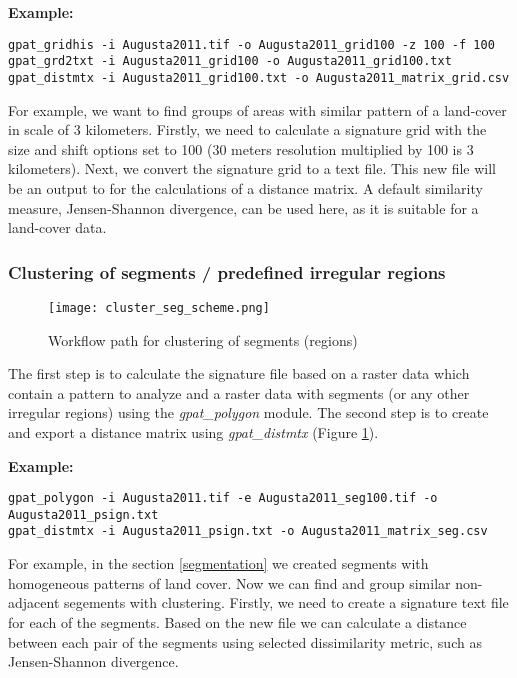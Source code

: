 {\bf Example:}

\begin{minipage}{\linewidth}
\begin{lstlisting}
gpat_gridhis -i Augusta2011.tif -o Augusta2011_grid100 -z 100 -f 100
gpat_grd2txt -i Augusta2011_grid100 -o Augusta2011_grid100.txt
gpat_distmtx -i Augusta2011_grid100.txt -o Augusta2011_matrix_grid.csv
\end{lstlisting}
\end{minipage}

For example, we want to find groups of areas with similar pattern of a land-cover in scale of 3 kilometers.
Firstly, we need to calculate a signature grid with the size and shift options set to 100 (30 meters resolution multiplied by 100 is 3 kilometers).
Next, we convert the signature grid to a text file.
This new file will be an output to for the calculations of a distance matrix.
A default similarity measure, Jensen-Shannon divergence, can be used here, as it is suitable for a land-cover data.

\FloatBarrier

\subsubsection{Clustering of segments / predefined irregular regions}

\begin{figure}[H]
	\centering
	\texttt{[image: cluster\_seg\_scheme.png]}
	\caption{Workflow path for clustering of segments (regions)}
	\label{FIG:CLUSTER_SEGMENT}
\end{figure}

The first step is to calculate the signature file based on a raster data which contain a pattern to analyze and a raster data with segments (or any other irregular regions) using the {\it gpat\_polygon} module.
The second step is to create and export a distance matrix using {\it gpat\_distmtx} (Figure \ref{FIG:CLUSTER_SEGMENT}).

{\bf Example:}

\begin{minipage}{\linewidth}
\begin{lstlisting}
gpat_polygon -i Augusta2011.tif -e Augusta2011_seg100.tif -o Augusta2011_psign.txt
gpat_distmtx -i Augusta2011_psign.txt -o Augusta2011_matrix_seg.csv
\end{lstlisting}
\end{minipage}

For example, in the section \ref{segmentation} we created segments with homogeneous patterns of land cover.
Now we can find and group similar non-adjacent segements with clustering.
Firstly, we need to create a signature text file for each of the segments.
Based on the new file we can calculate a distance between each pair of the segments using selected dissimilarity metric, such as Jensen-Shannon divergence.

\newpage

